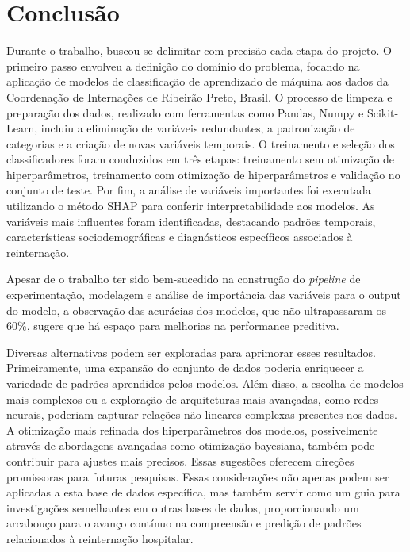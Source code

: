 \chapter{Conclusão}

Durante o trabalho, buscou-se delimitar com precisão cada etapa do projeto. O primeiro passo envolveu a definição do domínio do problema, focando na aplicação de modelos de classificação de aprendizado de máquina aos dados da Coordenação de Internações de Ribeirão Preto, Brasil. O processo de limpeza e preparação dos dados, realizado com ferramentas como Pandas, Numpy e Scikit-Learn, incluiu a eliminação de variáveis redundantes, a padronização de categorias e a criação de novas variáveis temporais. O treinamento e seleção dos classificadores foram conduzidos em três etapas: treinamento sem otimização de hiperparâmetros, treinamento com otimização de hiperparâmetros e validação no conjunto de teste. Por fim, a análise de variáveis importantes foi executada utilizando o método SHAP para conferir interpretabilidade aos modelos. As variáveis mais influentes foram identificadas, destacando padrões temporais, características sociodemográficas e diagnósticos específicos associados à reinternação.

Apesar de o trabalho ter sido bem-sucedido na construção do \textit{pipeline} de experimentação, modelagem e análise de importância das variáveis para o output do modelo, a observação das acurácias dos modelos, que não ultrapassaram os 60\%, sugere que há espaço para melhorias na performance preditiva.

Diversas alternativas podem ser exploradas para aprimorar esses resultados. Primeiramente, uma expansão do conjunto de dados poderia enriquecer a variedade de padrões aprendidos pelos modelos. Além disso, a escolha de modelos mais complexos ou a exploração de arquiteturas mais avançadas, como redes neurais, poderiam capturar relações não lineares complexas presentes nos dados. A otimização mais refinada dos hiperparâmetros dos modelos, possivelmente através de abordagens avançadas como otimização bayesiana, também pode contribuir para ajustes mais precisos. Essas sugestões oferecem direções promissoras para futuras pesquisas. Essas considerações não apenas podem ser aplicadas a esta base de dados específica, mas também servir como um guia para investigações semelhantes em outras bases de dados, proporcionando um arcabouço para o avanço contínuo na compreensão e predição de padrões relacionados à reinternação hospitalar.